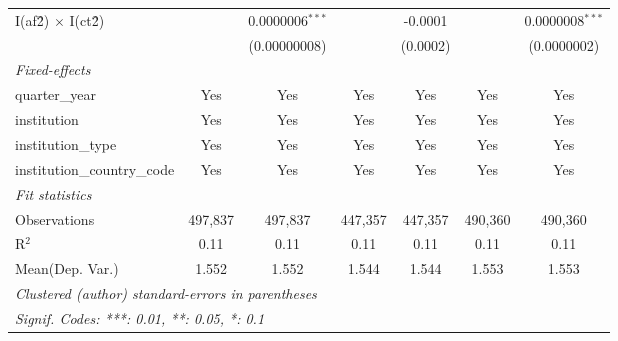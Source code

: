 \begin{tabular}{lcccccc}
   I(af\^2) $\times$ I(ct\^2)         &               & 0.0000006$^{***}$ &               & -0.0001        &               & 0.0000008$^{***}$\\   
                                      &               & (0.00000008)      &               & (0.0002)       &               & (0.0000002)\\   
   \midrule
   \emph{Fixed-effects}\\
   quarter\_year                      & Yes           & Yes               & Yes           & Yes            & Yes           & Yes\\  
   institution                        & Yes           & Yes               & Yes           & Yes            & Yes           & Yes\\  
   institution\_type                  & Yes           & Yes               & Yes           & Yes            & Yes           & Yes\\  
   institution\_country\_code         & Yes           & Yes               & Yes           & Yes            & Yes           & Yes\\  
   \midrule
   \emph{Fit statistics}\\
   Observations                       & 497,837       & 497,837           & 447,357       & 447,357        & 490,360       & 490,360\\  
   R$^2$                              & 0.11          & 0.11              & 0.11          & 0.11           & 0.11          & 0.11\\  
Mean(Dep. Var.) & 1.552 & 1.552 & 1.544 & 1.544 & 1.553 & 1.553 \\
   \midrule \midrule
   \multicolumn{7}{l}{\emph{Clustered (author) standard-errors in parentheses}}\\
   \multicolumn{7}{l}{\emph{Signif. Codes: ***: 0.01, **: 0.05, *: 0.1}}\\
\end{tabular}
\par\endgroup
